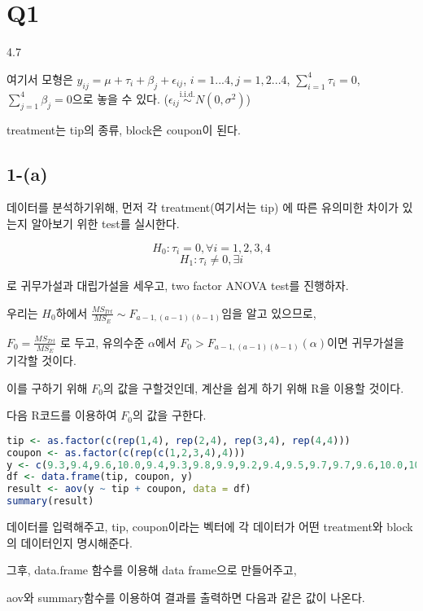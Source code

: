 \documentclass{article}
\begin{document}
\pagestyle{fancy}


\section{Q1} 

4.7

여기서 모형은 
$y_{ij} = \mu + \tau_i + \beta_j + \epsilon_{ij}$, $i = 1...4, j = 1, 2... 4$, $\sum_{i=1}^4 \tau_i = 0 $, $\sum_{j=1}^4 \beta_j = 0 $으로 놓을 수 있다.
($\epsilon_{ij}  \overset{\text{i.i.d.}}{\sim} N(0, \sigma^2)$)

treatment는 tip의 종류, block은 coupon이 된다.

\subsection{1-(a)}

데이터를 분석하기위해, 먼저 각 treatment(여기서는 tip) 에 따른 유의미한 차이가 있는지 알아보기 위한 test를 실시한다.

$$H_0 : \tau_i = 0 , \forall i = 1, 2, 3, 4$$ 
$$H_1 :  \tau_i \neq 0, \exists i$$

로 귀무가설과 대립가설을 세우고, two factor ANOVA test를 진행하자.

우리는 $H_0$하에서 $\frac{MS_{Trt}}{MS_E} \sim F_{a-1, (a-1)(b-1)} $임을 알고 있으므로,

$F_0 = \frac{MS_{Trt}}{MS_E}$ 로 두고,  유의수준 $\alpha$에서 $F_0 > F_{a-1, (a-1)(b-1)}(\alpha)$이면 귀무가설을 기각할 것이다.

이를 구하기 위해 $F_0$의 값을 구할것인데, 계산을 쉽게 하기 위해 R을 이용할 것이다.

다음 R코드를 이용하여 $F_0$의 값을 구한다.


\begin{lstlisting}[language=R]
tip <- as.factor(c(rep(1,4), rep(2,4), rep(3,4), rep(4,4)))
coupon <- as.factor(c(rep(c(1,2,3,4),4)))
y <- c(9.3,9.4,9.6,10.0,9.4,9.3,9.8,9.9,9.2,9.4,9.5,9.7,9.7,9.6,10.0,10.2)
df <- data.frame(tip, coupon, y)
result <- aov(y ~ tip + coupon, data = df)
summary(result)
\end{lstlisting}

데이터를 입력해주고, tip, coupon이라는 벡터에 각 데이터가 어떤 treatment와 block의 데이터인지 명시해준다.

그후, data.frame 함수를 이용해 data frame으로 만들어주고, 

aov와 summary함수를 이용하여 결과를 출력하면 다음과 같은 값이 나온다.
\end{document}

